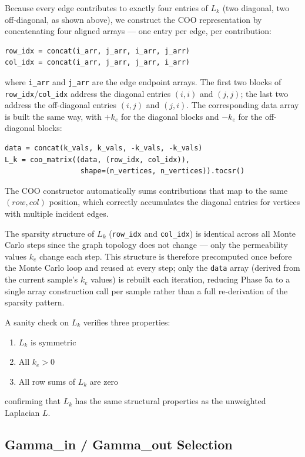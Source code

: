 \documentclass[a4paper,12pt]{amsart}
\numberwithin{equation}{section}
\begin{document}
Because every edge contributes to exactly four entries of $L_k$ (two 
diagonal, two off-diagonal, as shown above), we construct the COO 
representation by concatenating four aligned arrays — one entry per 
edge, per contribution:
\begin{verbatim}
row_idx = concat(i_arr, j_arr, i_arr, j_arr)
col_idx = concat(i_arr, j_arr, j_arr, i_arr)
\end{verbatim}
where \texttt{i\_arr} and \texttt{j\_arr} are the edge endpoint arrays. 
The first two blocks of \texttt{row\_idx}/\texttt{col\_idx} address the 
diagonal entries $(i,i)$ and $(j,j)$; the last two address the 
off-diagonal entries $(i,j)$ and $(j,i)$. The corresponding data array 
is built the same way, with $+k_e$ for the diagonal blocks and $-k_e$ 
for the off-diagonal blocks:
\begin{verbatim}
data = concat(k_vals, k_vals, -k_vals, -k_vals)
L_k = coo_matrix((data, (row_idx, col_idx)),
                  shape=(n_vertices, n_vertices)).tocsr()
\end{verbatim}
The COO constructor automatically sums contributions that map to the 
same $(row, col)$ position, which correctly accumulates the diagonal 
entries for vertices with multiple incident edges.

The sparsity structure of $L_k$ (\texttt{row\_idx} and \texttt{col\_idx}) 
is identical across all Monte Carlo steps since the graph topology does 
not change — only the permeability values $k_e$ change each step. This 
structure is therefore precomputed once before the Monte Carlo loop and 
reused at every step; only the \texttt{data} array (derived from the 
current sample's $k_e$ values) is rebuilt each iteration, reducing 
Phase 5a to a single array construction call per sample rather than a 
full re-derivation of the sparsity pattern.

A sanity check on $L_k$ verifies three properties:

\begin{enumerate}
    \item $L_k$ is symmetric
    \item All $k_e > 0$
    \item All row sums of $L_k$ are zero
\end{enumerate}

confirming that $L_k$ has the same structural properties as the 
unweighted Laplacian $L$.

\subsection{Gamma\_in / Gamma\_out Selection}
\label{sec:gamma_selection}
\end{document}
